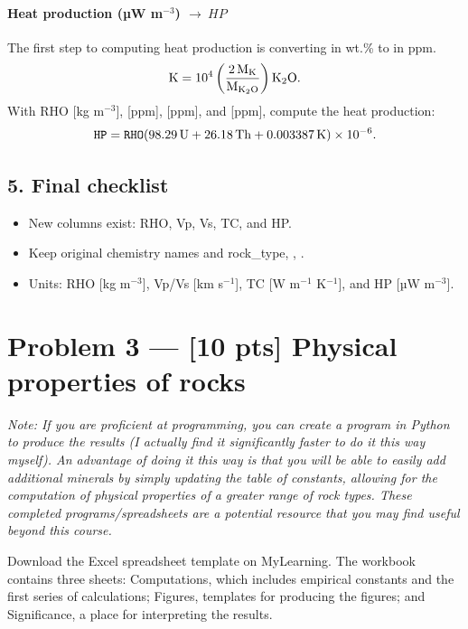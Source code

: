 \documentclass[11pt,a4paper]{article}
\begin{document}
\paragraph{Heat production (µW m$^{-3}$) \(\to\ HP\)}

The first step to computing heat production is converting  in wt.\% to  in ppm.
\[
  \ce{K} = 10^{4} \left( \frac{2\,\mathrm{M}_{\ce{K}}}{\mathrm{M}_{\ce{K2O}}} \right) \ce{K2O}.
\]
With RHO [kg m$^{-3}$],  [ppm],  [ppm], and  [ppm], compute the heat production:
\[
  \texttt{HP} = \texttt{RHO} ( 98.29\,\ce{U}
  + 26.18\,\ce{Th} + 0.003387\,\ce{K} )\times 10^{-6}.
\]

\subsection*{5.\; Final checklist}
\begin{itemize}[leftmargin=*]
  \item New columns exist: RHO, Vp, Vs, TC, and HP.
  \item Keep original chemistry names and rock\_type, , .
  \item Units: RHO [kg m$^{-3}$], Vp/Vs [km s$^{-1}$], TC [W m$^{-1}$ K$^{-1}$], and HP [µW m$^{-3}$].
\end{itemize}

\section*{Problem 3 --- [10 pts] Physical properties of rocks}\label{itm:physprop}

{\it Note: If you are proficient at programming, you can create a program in Python to produce the results (I actually find it significantly faster to do it this way myself).  An advantage of doing it this way is that you will be able to easily add additional minerals by simply updating the table of constants, allowing for the computation of physical properties of a greater range of rock types.  These completed programs/spreadsheets are a potential resource that you may find useful beyond this course.}

Download the Excel spreadsheet template on MyLearning.  The workbook contains three sheets: Computations, which includes empirical constants and the first series of calculations; Figures, templates for producing the figures; and Significance, a place for interpreting the results.
\end{document}

